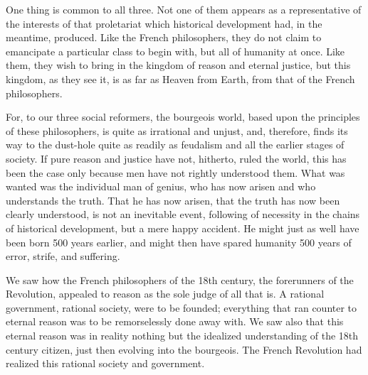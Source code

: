 One thing is common to all three. Not one of them appears as a representative of
the interests of that proletariat which historical development had, in the
meantime, produced. Like the French philosophers, they do not claim to
emancipate a particular class to begin with, but all of humanity at once. Like
them, they wish to bring in the kingdom of reason and eternal justice, but this
kingdom, as they see it, is as far as Heaven from Earth, from that of the French
philosophers.

For, to our three social reformers, the bourgeois world, based upon the
principles of these philosophers, is quite as irrational and unjust, and,
therefore, finds its way to the dust-hole quite as readily as feudalism and all
the earlier stages of society. If pure reason and justice have not, hitherto,
ruled the world, this has been the case only because men have not rightly
understood them. What was wanted was the individual man of genius, who has now
arisen and who understands the truth. That he has now arisen, that the truth has
now been clearly understood, is not an inevitable event, following of necessity
in the chains of historical development, but a mere happy accident. He might
just as well have been born 500 years earlier, and might then have spared
humanity 500 years of error, strife, and suffering.

We saw how the French philosophers of the 18th century, the forerunners of the
Revolution, appealed to reason as the sole judge of all that is. A rational
government, rational society, were to be founded; everything that ran counter to
eternal reason was to be remorselessly done away with. We saw also that this
eternal reason was in reality nothing but the idealized understanding of the
18th century citizen, just then evolving into the bourgeois. The French
Revolution had realized this rational society and government.

